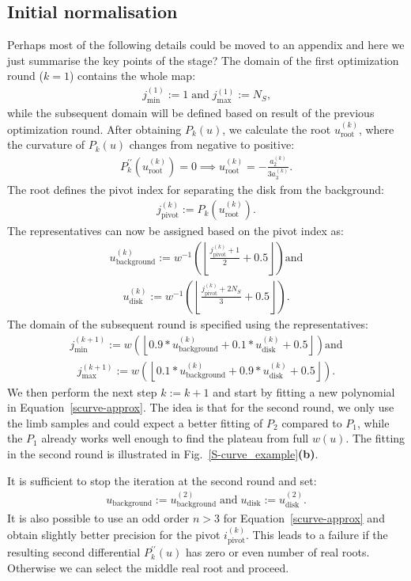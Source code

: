 \documentclass{aa}
\newcommand{\fg}[1]{\textcolor{midblue}{#1}}
\newcommand{\eqnl}[2]{\begin{eqnarray}\label{#1}#2\end{eqnarray}}
\newcommand{\floor}[1]{\left\lfloor #1 \right\rfloor}
\newcommand{\s}[2]{{#1}_{\mathrm{#2}}}
\begin{document}
  \subsection{Initial normalisation}\label{sect:s_curve}

  \fg{Perhaps most of the following details could be moved to an appendix and 
  here we just summarise the key points of the stage?}
  The domain of the first optimization round ($k=1$) contains the whole map:
  \eqnl{scurve-firstdomain}{
  \s{j}{min}^{(1)} := 1 \; \text{and} \; \s{j}{max}^{(1)} := N_S \text{,}
  }
  while the subsequent domain will be defined based on result of the previous optimization round. After obtaining 
  $P_k(u)$, we calculate the root $\s{u}{root}^{(k)}$, where the curvature of $P_k(u)$ changes from negative to 
  positive:
  \eqnl{scurve-root}{
  P_k^{\prime\prime}(\s{u}{root}^{(k)}) = 0 \implies \s{u}{root}^{(k)} = -\frac{a_2^{(k)}}{3 a_3^{(k)}} \text{.}
  }
  The root defines the pivot index for separating the disk from the background:
  \eqnl{scurve-pivot}{
  \s{j}{pivot}^{(k)} := P_k(\s{u}{root}^{(k)}) \text{.}
  }
  The representatives can now be assigned based on the pivot index as:
  \eqnl{scurve-background}{
  \s{u}{background}^{(k)} := w^{-1} \left( \floor{\frac{\s{j}{pivot}^{(k)} + 1}{2} + 0.5} \right) \text{and}
  }
  \eqnl{scurve-disk}{
  \s{u}{disk}^{(k)} := w^{-1} \left( \floor{\frac{\s{j}{pivot}^{(k)} + 2 N_S}{3} + 0.5} \right) \text{.}
  }
  The domain of the subsequent round is specified using the representatives:
  \eqnl{scurve-nextdomain-min}{
  \s{j}{min}^{(k+1)} := w \left( \floor{ 0.9 * \s{u}{background}^{(k)} + 0.1 * \s{u}{disk}^{(k)} + 0.5 } \right) \text{and}
  }
  \eqnl{scurve-nextdomain-max}{
  \s{j}{max}^{(k+1)} := w \left( \floor{ 0.1 * \s{u}{background}^{(k)} + 0.9 * \s{u}{disk}^{(k)} + 0.5 } \right) \text{.}
  }
  We then perform the next step $k := k+1$ and start by fitting a new polynomial in Equation~\ref{scurve-approx}. The 
  idea is that for the second round, we only use the limb samples and could expect a better fitting of $P_2$ compared to 
  $P_1$, while the $P_1$ already works well enough to find the plateau from full $w(u)$. The fitting in the second round is illustrated in Fig.~\ref{S-curve_example}{\bf(b)}.

  It is sufficient to stop the iteration at the second round and set:
  \eqnl{scurve-converged}{
  \s{u}{background} := \s{u}{background}^{(2)} \; \text{and} \; \s{u}{disk} := \s{u}{disk}^{(2)} \text{.}
  }
  It is also possible to use an odd order $n > 3$ for Equation~\ref{scurve-approx} and obtain slightly better precision 
  for the pivot $\s{i}{pivot}^{(k)}$. This leads to a failure if the resulting second differential $P_k^{\prime\prime}(u)$ 
  has zero or even number of real roots. Otherwise we can select the middle real root and proceed.
\end{document}
